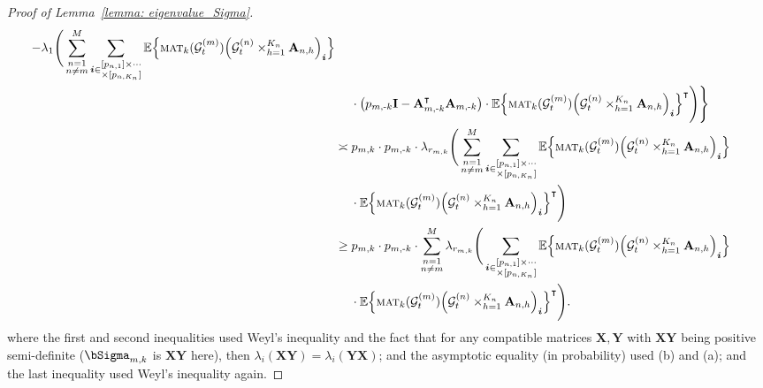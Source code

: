 \documentclass[aos]{imsart}
\theoremstyle{plain}
\theoremstyle{definition}
\def\mat{\textnormal{\textsc{mat}}}
\def\E{\mathbb{E}}
\def\cG{\mathcal{G}} \def\cH{\boldsymbol{\mathcal{H}}} \def\cI{\mathcal{I}}
\def\bi{\boldsymbol{i}}
\def\bI{\mathbf{I}}
\def\bA{\mathbf{A}}
\def\bX{\mathbf{X}}
\def\bY{\mathbf{Y}}
\def\trans{\intercal}
\begin{document}
\begin{proof}[Proof of Lemma~\ref{lemma: eigenvalue_Sigma}]
\begin{align}
    - \lambda_{1}\Bigg( \sum_{\substack{n=1\\ n\neq m}}^M \sum_{\bi \in \substack{[p_{n,1}] \times \cdots\\ \times[p_{n,K_n}] }} \E\Big\{ \mat_k(\cG_t^{(m)}) \Big( \cG_t^{(n)} \times_{h=1}^{K_n} \bA_{n,h} \Big)_{\bi} \Big\} \notag \\
    &\;\quad
    \cdot \big( p_{m,\text{-}k} \bI - \bA_{m,\text{-}k}^\trans \bA_{m,\text{-}k} \big) \cdot \E\Big\{ \mat_k(\cG_t^{(m)}) \Big( \cG_t^{(n)} \times_{h=1}^{K_n} \bA_{n,h} \Big)_{\bi} \Big\}^\trans \Bigg) \Bigg\} \notag \\
    &\asymp
    p_{m,k} \cdot p_{m,\text{-}k} \cdot \lambda_{r_{m,k}}\Bigg( \sum_{\substack{n=1\\ n\neq m}}^M \sum_{\bi \in \substack{[p_{n,1}] \times \cdots\\ \times[p_{n,K_n}] }} \E\Big\{ \mat_k(\cG_t^{(m)}) \Big( \cG_t^{(n)} \times_{h=1}^{K_n} \bA_{n,h} \Big)_{\bi} \Big\} \notag \\
    &\;\quad
    \cdot \E\Big\{ \mat_k(\cG_t^{(m)}) \Big( \cG_t^{(n)} \times_{h=1}^{K_n} \bA_{n,h} \Big)_{\bi} \Big\}^\trans \Bigg) \notag \\
    &\geq
    p_{m,k} \cdot p_{m,\text{-}k} \cdot \sum_{\substack{n=1\\ n\neq m}}^M \lambda_{r_{m,k}}\Bigg( \sum_{\bi \in \substack{[p_{n,1}] \times \cdots\\ \times[p_{n,K_n}] }} \E\Big\{ \mat_k(\cG_t^{(m)}) \Big( \cG_t^{(n)} \times_{h=1}^{K_n} \bA_{n,h} \Big)_{\bi} \Big\} \notag \\
    &\;\quad
    \cdot \E\Big\{ \mat_k(\cG_t^{(m)}) \Big( \cG_t^{(n)} \times_{h=1}^{K_n} \bA_{n,h} \Big)_{\bi} \Big\}^\trans \Bigg) . \label{eqn: eigenvalue_Sigma_step}
\end{align}
where the first and second inequalities used Weyl's inequality and the fact that for any compatible matrices $\bX,\bY$ with $\bX\bY$ being positive semi-definite ($\bSigma_{m,k}$ is $\bX\bY$ here), then $\lambda_i(\bX\bY)=\lambda_i(\bY\bX)$; and the asymptotic equality (in probability) used (b) and (a); and the last inequality used Weyl's inequality again.



\end{proof}
\end{document}
